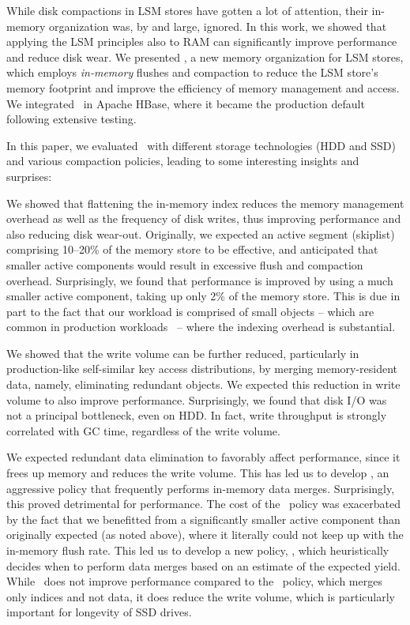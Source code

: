 
While disk compactions in LSM stores have gotten a lot of attention, their in-memory organization was, by and large,  ignored.
In this work, we showed that applying the LSM  principles also to RAM can significantly improve performance and reduce disk wear. 
We presented \sys, a new memory organization for LSM stores, which employs \emph{in-memory} flushes and 
compaction to reduce the LSM store's memory footprint and improve the efficiency of memory management and access. 
We integrated \sys\ in Apache HBase, where it became the production default following extensive testing. 

In this paper, we evaluated \sys\ with different storage technologies (HDD and SSD) and various compaction policies, leading
to some interesting insights and surprises:

We showed that flattening the in-memory index reduces the memory management overhead as well as the frequency of
disk writes, thus  improving performance and also reducing disk wear-out. Originally, we expected  an active segment
(skiplist) comprising 10--20\% of the memory store to be effective, and anticipated that smaller active components would 
result in excessive flush and compaction overhead. Surprisingly, we found that performance is improved by using a much 
smaller active component, taking up only 2\% of the memory store. This is due in part to the fact that our workload is comprised
of small objects -- which are common in production workloads~\cite{Wu2015} -- where the indexing overhead is substantial.   

We showed that the write volume can be further reduced, particularly in production-like self-similar key access distributions, by merging memory-resident data, namely, eliminating redundant objects.
We expected this reduction in write volume to also improve performance. Surprisingly, we found that 
disk I/O was not a principal bottleneck, even on HDD. In fact, write throughput is strongly correlated with GC time, 
regardless of the write volume.

We expected redundant data elimination to favorably affect performance, since it frees up memory and reduces the write volume.
This has led us to develop \eager, an aggressive policy that frequently performs in-memory data merges. 
Surprisingly, this proved detrimental for performance. The cost of the \eager\ policy was exacerbated by the 
fact that we benefitted from a significantly smaller active component than originally expected (as noted above),  
where it literally could not keep up with the in-memory flush rate. 
This led us to develop a new policy, \adp, which heuristically decides when to perform data merges based on 
an estimate of the expected yield. 
While \adp\ does not improve performance compared to the  \basic\ policy, which merges only indices and not data,
it does reduce the write volume, which is particularly important for longevity of SSD drives.

